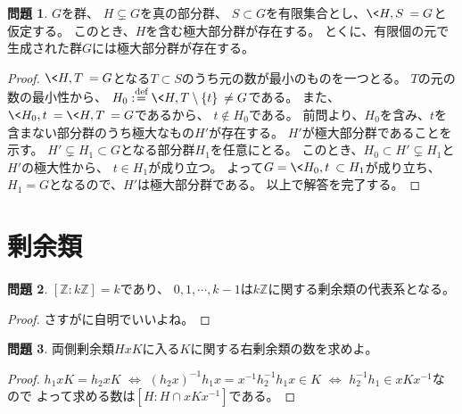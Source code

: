 \documentclass[uplatex]{jsreport}
\theoremstyle{definition}
\newtheorem{prob}[prob]{問題}
\newcommand{\dfn}{:\overset{\mbox{{\scriptsize def}}}{=}}
\newcommand{\Z}{\mathbb{Z}}
\begin{document}
\begin{prob}
  \(G\)を群、
  \(H\subsetneq G\)を真の部分群、
  \(S\subset G\)を有限集合とし、\(\<H,S\> = G\)と仮定する。
  このとき、\(H\)を含む極大部分群が存在する。
  とくに、有限個の元で生成された群\(G\)には極大部分群が存在する。
\end{prob}

\begin{proof}
  \(\<H,T\>=G\)となる\(T\subset S\)のうち元の数が最小のものを一つとる。
  \(T\)の元の数の最小性から、
  \(H_0\dfn \<H,T\setminus\{t\}\>\neq G\)である。
  また、\(\<H_0,t\> = \<H,T\> = G\)であるから、
  \(t\not\in H_0\)である。
  前問より、\(H_0\)を含み、\(t\)を含まない部分群のうち極大なもの\(H'\)が存在する。
  \(H'\)が極大部分群であることを示す。
  \(H'\subsetneq H_1\subset G\)となる部分群\(H_1\)を任意にとる。
  このとき、\(H_0\subset H'\subsetneq H_1\)と\(H'\)の極大性から、
  \(t\in H_1\)が成り立つ。
  よって\(G = \<H_0,t\> \subset H_1\)が成り立ち、
  \(H_1 = G\)となるので、\(H'\)は極大部分群である。
  以上で解答を完了する。
\end{proof}







\section{剰余類}



\begin{prob}
  \([\Z:k\Z] = k\)であり、
  \(0,1,\cdots,k-1\)は\(k\Z\)に関する剰余類の代表系となる。
\end{prob}

\begin{proof}
  さすがに自明でいいよね。
\end{proof}



\begin{prob}
  両側剰余類\(HxK\)に入る\(K\)に関する右剰余類の数を求めよ。
\end{prob}

\begin{proof}
  \(h_1xK = h_2xK\) \(\iff\)
  \((h_2x)^{-1}h_1x = x^{-1}h_2^{-1}h_1 x \in K\) \(\iff\)
  \(h_2^{-1}h_1\in xKx^{-1}\)なので
  よって求める数は\([H:H\cap xKx^{-1}]\)である。
\end{proof}
\end{document}

